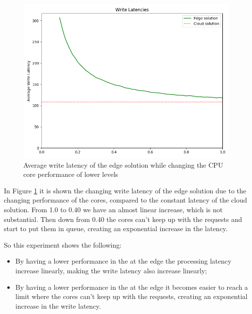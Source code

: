 \begin{figure}[H]
    \centering
    \includegraphics[width=0.95\linewidth]{Figures/Evaluation/write-all-cpu-latency.png}
    \caption{Average write latency of the edge solution while changing the CPU core performance of lower levels}
    \label{fig:/write-all-cpu-latency}
\end{figure}

In Figure \ref{fig:/write-all-cpu-latency} it is shown the changing write latency of the edge solution due to the changing performance of the  cores, compared to the constant latency of the cloud solution. From 1.0 to 0.40 we have an almost linear increase, which is not substantial. Then down from 0.40 the cores can't keep up with the requests and start to put them in queue, creating an exponential increase in the latency.

So this experiment shows the following:
\begin{itemize}
    \item By having a lower performance in the  at the edge the processing latency increase linearly, making the write latency also increase linearly;
    \item By having a lower performance in the  at the edge it becomes easier to reach a limit where the cores can't keep up with the requests, creating an exponential increase in the write latency.
\end{itemize}















